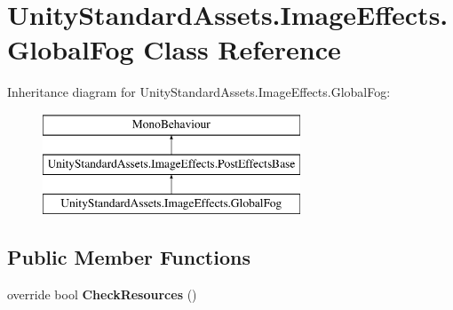 \hypertarget{class_unity_standard_assets_1_1_image_effects_1_1_global_fog}{}\section{Unity\+Standard\+Assets.\+Image\+Effects.\+Global\+Fog Class Reference}
\label{class_unity_standard_assets_1_1_image_effects_1_1_global_fog}
Inheritance diagram for Unity\+Standard\+Assets.\+Image\+Effects.\+Global\+Fog\+:\begin{figure}[H]
\begin{center}
\leavevmode
\includegraphics[height=3.000000cm]{class_unity_standard_assets_1_1_image_effects_1_1_global_fog}
\end{center}
\end{figure}
\subsection*{Public Member Functions}
\begin{DoxyCompactItemize}
\item 
override bool {\bfseries Check\+Resources} ()\hypertarget{class_unity_standard_assets_1_1_image_effects_1_1_global_fog_af644a7d78d3aef80dbc6faa274051776}{}\label{class_unity_standard_assets_1_1_image_effects_1_1_global_fog_af644a7d78d3aef80dbc6faa274051776}

\end{DoxyCompactItemize}
